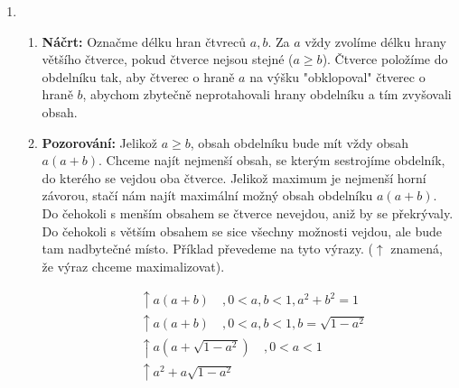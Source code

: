\documentclass[12pt]{article}
\begin{document}
\begin{enumerate}
\item
    \begin{enumerate} 
      \item \textbf{Náčrt:}
      Označme délku hran čtvreců $a,b$.
      Za $a$ vždy zvolíme délku hrany většího čtverce, pokud čtverce nejsou stejné ($a \geq b$).
      Čtverce položíme do obdelníku tak, aby čtverec o hraně $a$
      na výšku "obklopoval" čtverec o hraně $b$,
      abychom zbytečně neprotahovali hrany obdelníku a tím zvyšovali obsah.
      

      \item \textbf{Pozorování:} 
      Jelikož $a \geq b$, obsah obdelníku bude mít vždy obsah $a(a+b)$.
      Chceme najít nejmenší obsah, se kterým sestrojíme obdelník, do kterého se vejdou oba čtverce.
      Jelikož maximum je nejmenší horní závorou, stačí nám najít maximální možný obsah obdelníku $a(a+b)$.
      Do čehokoli s menším obsahem se čtverce nevejdou, aniž by se překrývaly.
      Do čehokoli s větším obsahem se sice všechny možnosti vejdou, ale bude tam nadbytečné místo.
      Příklad převedeme na tyto výrazy. ($\uparrow$ znamená, že výraz chceme maximalizovat).

      \begin{align*}
        &\uparrow a(a+b) \quad , 0 < a,b < 1, a^2+b^2 = 1 \\
        &\uparrow a(a+b) \quad , 0 < a,b < 1, b = \sqrt{1-a^2} \\
        &\uparrow a(a + \sqrt{1-a^2}) \quad , 0 < a < 1 \\
        &\uparrow a^2 + a \sqrt{1-a^2}
      \end{align*}


\end{enumerate}
\end{enumerate}
\end{document}
